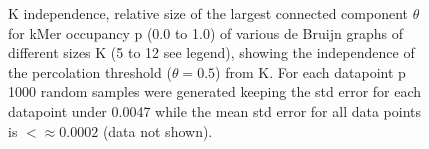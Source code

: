 \documentclass[12pt]{article} \usepackage{simplemargins}
\begin{document}
\begin{figure}

\caption{K independence, relative size of the largest connected component
$\theta$ for kMer occupancy p (0.0 to 1.0) of various de Bruijn graphs of
different sizes K (5 to 12 see legend), showing the independence of the
percolation threshold ($\theta = 0.5$) from K.
For each datapoint p 1000 random samples were generated keeping the std error
for each datapoint under 0.0047 while the mean std error for all data points is
$< \approx 0.0002$ (data not shown).}
\end{figure}
\end{document}
